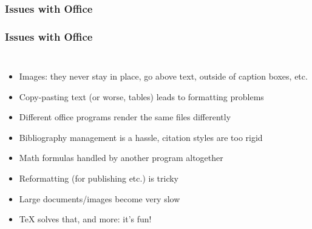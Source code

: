 \documentclass[xetex,colorlinks]{beamer} %
\begin{document}
  \subsubsection{Issues with Office}
  \begin{frame}
    \frametitle{Issues with Office}
    \begin{columns}
      \begin{itemize}
      \item Images: they never stay in place, go above text, outside of caption boxes, etc.
      \item Copy-pasting text (or worse, tables) leads to formatting problems
      \item Different office programs render the same files differently
      \item Bibliography management is a hassle, citation styles are too rigid
      \item Math formulas handled by another program altogether
      \item Reformatting (for publishing etc.) is tricky
      \item Large documents/images become very slow
      \item \TeX{} solves that, and more: it's fun!
      \end{itemize}
      
    \end{columns}
  \end{frame}
  
\end{document}
